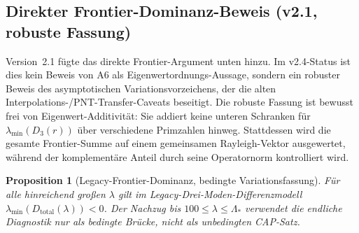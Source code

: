 ﻿\documentclass[12pt,a4paper]{article}
\newtheorem{proposition}[theorem]{Proposition}
\theoremstyle{definition}
\theoremstyle{remark}
\begin{document}
\subsection{Direkter Frontier-Dominanz-Beweis (v2.1, robuste Fassung)}
\label{sec:direct-frontier}

Version~2.1 fügte das direkte Frontier-Argument unten hinzu. Im v2.4-Status ist dies kein Beweis von A6 als Eigenwertordnungs-Aussage, sondern ein robuster Beweis des asymptotischen Variationsvorzeichens, der die alten Interpolations-/PNT-Transfer-Caveats beseitigt. Die robuste Fassung ist bewusst frei von Eigenwert-Additivität: Sie addiert keine unteren Schranken für $\lambda_{\min}(D_3(r))$ über verschiedene Primzahlen hinweg. Stattdessen wird die gesamte Frontier-Summe auf einem gemeinsamen Rayleigh-Vektor ausgewertet, während der komplementäre Anteil durch seine Operatornorm kontrolliert wird.

\begin{proposition}[Legacy-Frontier-Dominanz, bedingte Variationsfassung]
\label{prop:direct-frontier}
Für alle hinreichend großen $\lambda$ gilt im Legacy-Drei-Moden-Differenzmodell
$\lambda_{\min}(D_{\mathrm{total}}(\lambda)) < 0$. Der Nachzug bis
$100\leq\lambda\leq\Lambda_*$ verwendet die endliche Diagnostik nur als bedingte
Brücke, nicht als unbedingten CAP-Satz.
\end{proposition}
\end{document}
